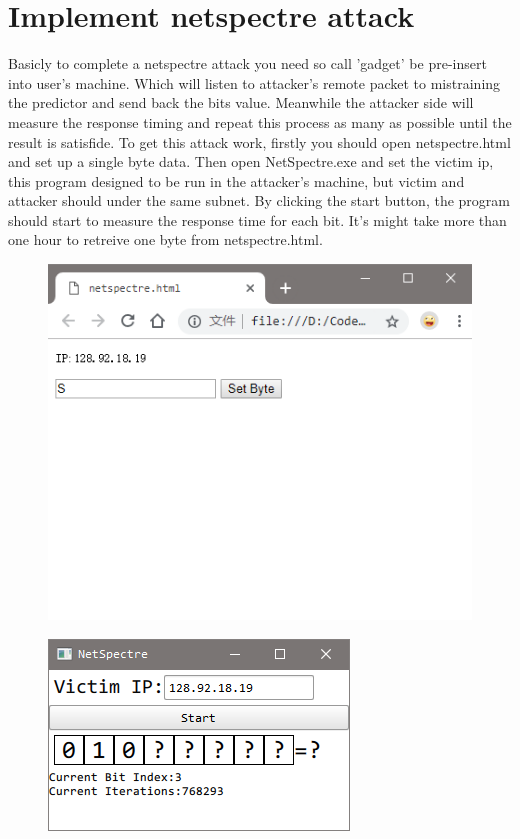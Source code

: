 \documentclass{article}
\begin{document}
\section{Implement netspectre attack}
Basicly to complete a netspectre attack you need so call 'gadget' be pre-insert into user's machine. Which will listen to attacker's remote packet to mistraining the predictor and send back the bits value. Meanwhile the attacker side will measure the response timing and repeat this process as many as possible until the result is satisfide.
\newline
\newline
To get this attack work, firstly you should open netspectre.html and set up a single byte data. Then open NetSpectre.exe and set the victim ip, this program designed to be run in the attacker's machine, but victim and attacker should under the same subnet. By clicking the start button, the program should start to measure the response time for each bit. It's might take more than one hour to retreive one byte from netspectre.html.
\begin{figure}[H]\centering\includegraphics{05.png}\end{figure}
\begin{figure}[H]\centering\includegraphics{03.png}\end{figure}
\end{document}
